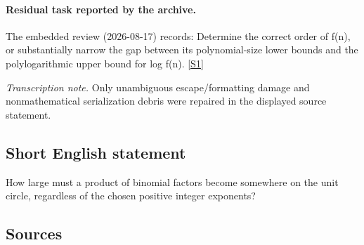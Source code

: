\documentclass[11pt,a4paper]{article}
\newcommand{\sref}[2]{\hyperlink{source:#1:#2}{[S#2]}}
\begin{document}
\paragraph{Residual task reported by the archive.}

The embedded review (2026-08-17) records: Determine the correct order of f(n), or substantially narrow the gap between its polynomial-size lower bounds and the polylogarithmic upper bound for log f(n). \sref{2011}{1}

{\small\emph{Transcription note.} Only unambiguous escape/formatting damage and nonmathematical serialization debris were repaired in the displayed source statement.}

\subsection{Short English statement}

How large must a product of binomial factors become somewhere on the unit circle, regardless of the chosen positive integer exponents?

\subsection{Sources}
\end{document}
